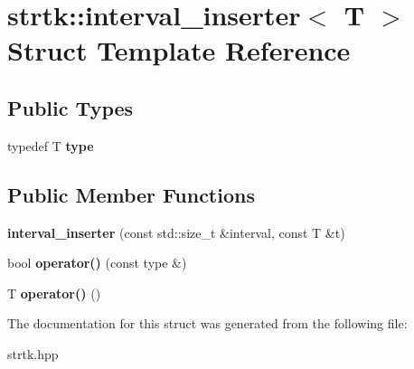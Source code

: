 \hypertarget{structstrtk_1_1interval__inserter}{\section{strtk\-:\-:interval\-\_\-inserter$<$ T $>$ Struct Template Reference}
\label{structstrtk_1_1interval__inserter}
}
\subsection*{Public Types}
\begin{DoxyCompactItemize}
\item 
\hypertarget{structstrtk_1_1interval__inserter_a1dba0130eae6769dc258e4b07333c6a9}{typedef T {\bfseries type}}\label{structstrtk_1_1interval__inserter_a1dba0130eae6769dc258e4b07333c6a9}

\end{DoxyCompactItemize}
\subsection*{Public Member Functions}
\begin{DoxyCompactItemize}
\item 
\hypertarget{structstrtk_1_1interval__inserter_a98237e47c9530b9c41755319c85950ff}{{\bfseries interval\-\_\-inserter} (const std\-::size\-\_\-t \&interval, const T \&t)}\label{structstrtk_1_1interval__inserter_a98237e47c9530b9c41755319c85950ff}

\item 
\hypertarget{structstrtk_1_1interval__inserter_af05a2e0a2698da29faa0c6a1aba6e238}{bool {\bfseries operator()} (const type \&)}\label{structstrtk_1_1interval__inserter_af05a2e0a2698da29faa0c6a1aba6e238}

\item 
\hypertarget{structstrtk_1_1interval__inserter_a82a5e17831953a6aad3cf0924e73c8b3}{T {\bfseries operator()} ()}\label{structstrtk_1_1interval__inserter_a82a5e17831953a6aad3cf0924e73c8b3}

\end{DoxyCompactItemize}


The documentation for this struct was generated from the following file\-:\begin{DoxyCompactItemize}
\item 
strtk.\-hpp\end{DoxyCompactItemize}
